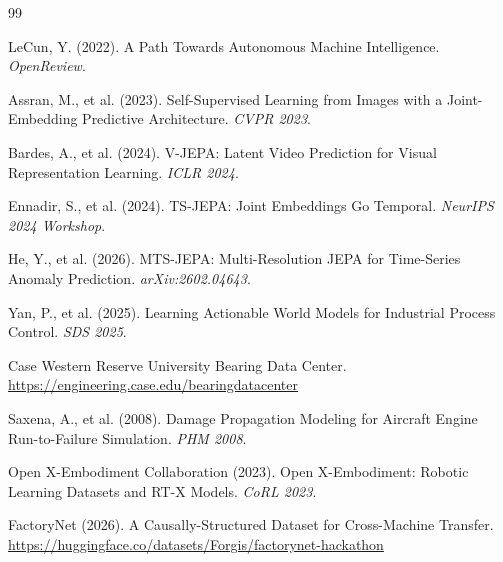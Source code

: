 \documentclass{article}
\begin{document}

\begin{thebibliography}{99}

LeCun, Y. (2022). A Path Towards Autonomous Machine Intelligence. \textit{OpenReview}.

Assran, M., et al. (2023). Self-Supervised Learning from Images with a Joint-Embedding Predictive Architecture. \textit{CVPR 2023}.

Bardes, A., et al. (2024). V-JEPA: Latent Video Prediction for Visual Representation Learning. \textit{ICLR 2024}.

Ennadir, S., et al. (2024). TS-JEPA: Joint Embeddings Go Temporal. \textit{NeurIPS 2024 Workshop}.

He, Y., et al. (2026). MTS-JEPA: Multi-Resolution JEPA for Time-Series Anomaly Prediction. \textit{arXiv:2602.04643}.

Yan, P., et al. (2025). Learning Actionable World Models for Industrial Process Control. \textit{SDS 2025}.

Case Western Reserve University Bearing Data Center. \url{https://engineering.case.edu/bearingdatacenter}

Saxena, A., et al. (2008). Damage Propagation Modeling for Aircraft Engine Run-to-Failure Simulation. \textit{PHM 2008}.

Open X-Embodiment Collaboration (2023). Open X-Embodiment: Robotic Learning Datasets and RT-X Models. \textit{CoRL 2023}.

FactoryNet (2026). A Causally-Structured Dataset for Cross-Machine Transfer. \url{https://huggingface.co/datasets/Forgis/factorynet-hackathon}

\end{thebibliography}
\end{document}
